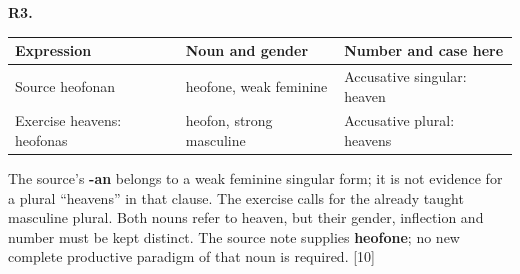 \par\begin{minipage}{\linewidth}\raggedright
\textbf{R3.}

\par\begingroup
\fontsize{10.5}{13.2}\selectfont
\setlength{\LTleft}{0pt}\setlength{\LTright}{\fill}
\noindent
\begin{tabular}{@{}>{\raggedright\arraybackslash}p{40.24mm}>{\raggedright\arraybackslash}p{36.85mm}>{\raggedright\arraybackslash}p{41.29mm}@{}}
\toprule
\textbf{Expression} & \textbf{Noun and gender} & \textbf{Number and case here} \\
\midrule
Source heofonan & heofone, weak feminine & Accusative singular: heaven \\
Exercise heavens: heofonas & heofon, strong masculine & Accusative plural: heavens \\
\bottomrule
\end{tabular}
\par\endgroup

The source's \textbf{-an} belongs to a weak feminine singular form; it is not evidence for a plural “heavens” in that clause. The exercise calls for the already taught masculine plural. Both nouns refer to heaven, but their gender, inflection and number must be kept distinct. The source note supplies \textbf{heofone}; no new complete productive paradigm of that noun is required. [10]

\end{minipage}\par\addvspace{4pt}

